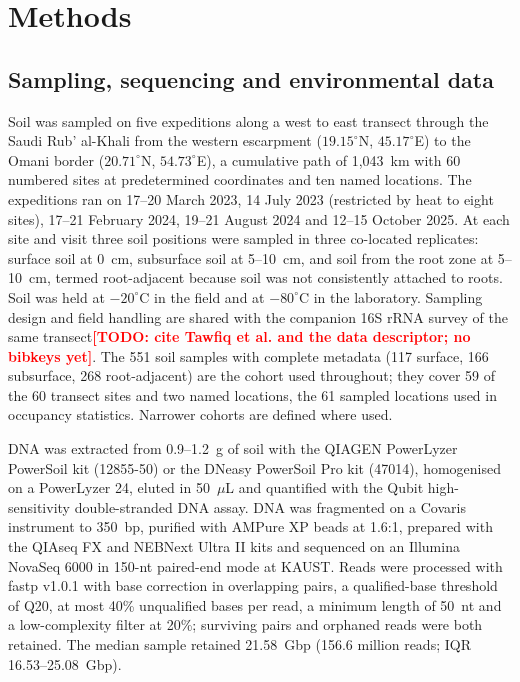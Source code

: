 \documentclass[11pt]{article}
\providecommand{\todo}[1]{\textcolor{red}{\textbf{[TODO: #1]}}}
\begin{document}
\section*{Methods}

\subsection*{Sampling, sequencing and environmental data}
Soil was sampled on five expeditions along a west to east transect through the Saudi Rub' al-Khali
from the western escarpment ($19.15^\circ$N, $45.17^\circ$E) to the Omani border ($20.71^\circ$N,
$54.73^\circ$E), a cumulative path of 1{,}043~km with 60 numbered sites at predetermined coordinates
and ten named locations. The expeditions ran on 17--20 March 2023, 14 July 2023 (restricted by heat
to eight sites), 17--21 February 2024, 19--21 August 2024 and 12--15 October 2025. At each site and
visit three soil positions were sampled in three co-located replicates: surface soil at 0~cm,
subsurface soil at 5--10~cm, and soil from the root zone at 5--10~cm, termed root-adjacent because
soil was not consistently attached to roots. Soil was held at $-20^\circ$C in the field and at
$-80^\circ$C in the laboratory. Sampling design and field handling are shared with the companion
16S rRNA survey of the same transect\todo{cite Tawfiq et al. and the data descriptor; no bibkeys
yet}. The 551 soil samples with complete metadata (117 surface, 166 subsurface, 268 root-adjacent)
are the cohort used throughout; they cover 59 of the 60 transect sites and two named locations, the
61 sampled locations used in occupancy statistics. Narrower cohorts are defined where used.

DNA was extracted from 0.9--1.2~g of soil with the QIAGEN PowerLyzer PowerSoil kit (12855-50) or the
DNeasy PowerSoil Pro kit (47014), homogenised on a PowerLyzer 24, eluted in 50~$\mu$L and quantified
with the Qubit high-sensitivity double-stranded DNA assay. DNA was fragmented on a Covaris instrument
to 350~bp, purified with AMPure XP beads at 1.6:1, prepared with the QIAseq FX and NEBNext Ultra II
kits and sequenced on an Illumina NovaSeq 6000 in 150-nt paired-end mode at KAUST. Reads were
processed with fastp v1.0.1 \citep{chen2018fastp} with base correction in overlapping pairs, a
qualified-base threshold of Q20, at most 40\% unqualified bases per read, a minimum length of 50~nt
and a low-complexity filter at 20\%; surviving pairs and orphaned reads were both retained. The
median sample retained 21.58~Gbp (156.6 million reads; IQR 16.53--25.08~Gbp).
\end{document}
